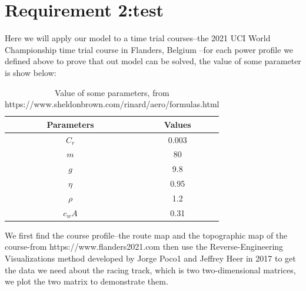 \documentclass[12pt]{article}
\begin{document}
\section{Requirement 2:test}
Here we will apply our model to a time trial courses--the 2021 UCI World Championship time trial course in Flanders, Belgium --for each power profile we defined
above to prove that out model can be solved, the value of some parameter is show below:
\begin{table}[H]
    \centering
    \begin{tabular}{cc}
        \toprule
        \bf Parameters & \bf Values \\
        \midrule
        $C_r$          & 0.003      \\
        $m$            & 80         \\
        $g$            & 9.8        \\
        $\eta $        & 0.95       \\
        $\rho  $       & 1.2        \\
        $c_wA$         & 0.31       \\
        \bottomrule
    \end{tabular}
    \caption{Value of some parameters, from https://www.sheldonbrown.com/rinard/aero/formulas.html}
\end{table}
We first find the course profile--the route map and the topographic map of the course-from https://www.flanders2021.com
then use the Reverse-Engineering Visualizations method developed by Jorge Poco1 and Jeffrey Heer in 2017\cite{poco2017reverse} to get the data we need about the racing track,
which is two two-dimensional matrices, we plot the two matrix to demonstrate them.
\end{document}
